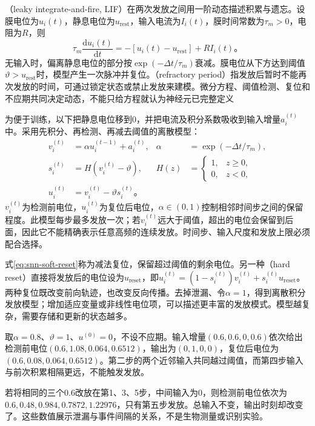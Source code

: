 （leaky integrate-and-fire, LIF）在两次发放之间用一阶动态描述积累与遗忘。设膜电位为$u_i(t)$，静息电位为$u_{\mathrm{rest}}$，输入电流为$I_i(t)$，膜时间常数为$\tau_m>0$，电阻为$R$，则
\begin{equation}
  \tau_m\frac{\mathrm d u_i(t)}{\mathrm d t}
  =-[u_i(t)-u_{\mathrm{rest}}]+RI_i(t)\text{。}
  \label{eq:snn-continuous-lif}
\end{equation}
无输入时，偏离静息电位的部分按$\exp(-\Delta t/\tau_m)$衰减。膜电位从下方达到阈值$\vartheta>u_{\mathrm{rest}}$时，模型产生一次脉冲并复位。（refractory period）指发放后暂时不能再次发放的时间，可通过锁定状态或禁止发放来建模。微分方程、阈值检测、复位和不应期共同决定动态，不能只给方程就认为神经元已完整定义

为便于训练，以下把静息电位移到0，并把电流及积分系数吸收到输入增量$a_i^{(t)}$中。采用先积分、再检测、再减去阈值的离散模型：
\begin{align}
  v_i^{(t)}&=\alpha u_i^{(t-1)}+a_i^{(t)},
  &\alpha&=\exp(-\Delta t/\tau_m),\label{eq:snn-discrete-integrate}\\
  s_i^{(t)}&=H(v_i^{(t)}-\vartheta),
  &H(z)&=\begin{cases}1,&z\geq0,\\0,&z<0,\end{cases}
  \label{eq:snn-discrete-fire}\\
  u_i^{(t)}&=v_i^{(t)}-\vartheta s_i^{(t)}\text{。}
  \label{eq:snn-soft-reset}
\end{align}
$v_i^{(t)}$为检测前电位，$u_i^{(t)}$为复位后电位，$\alpha\in(0,1)$控制相邻时间步之间的保留程度。此模型每步最多发放一次；若$v_i^{(t)}$远大于阈值，超出的电位会保留到后面，因此它不能精确表示任意高频的连续发放。时间步、输入尺度和发放上限必须配合选择。

式\eqref{eq:snn-soft-reset}称为减法复位，保留超过阈值的剩余电位。另一种（hard reset）直接将发放后的电位设为$u_{\mathrm{reset}}$，即$u_i^{(t)}=(1-s_i^{(t)})v_i^{(t)}+s_i^{(t)}u_{\mathrm{reset}}$。两种复位既改变前向轨迹，也改变反向传播。去掉泄漏、令$\alpha=1$，得到离散积分发放模型；增加适应变量或非线性电位项，可以描述更丰富的发放模式。模型越复杂，需要存储和更新的状态越多。

\begin{example}[相同输入在不同间隔下的结果]
  \label{ex:snn-integration}
  取$\alpha=0.8$、$\vartheta=1$、$u^{(0)}=0$，不设不应期。输入增量$(0.6,0.6,0,0.6)$依次给出检测前电位$(0.6,1.08,0.064,0.6512)$，输出为$(0,1,0,0)$，复位后电位为$(0.6,0.08,0.064,0.6512)$。第二步的两个近邻输入共同越过阈值，而第四步输入与前次积累相隔更远，不能触发发放。

  若将相同的三个$0.6$改放在第1、3、5步，中间输入为0，则检测前电位依次为$0.6,0.48,0.984,0.7872,1.22976$，只有第五步发放。总输入不变，输出时刻却改变了。这些数值展示泄漏与事件间隔的关系，不是生物测量或识别实验。
\end{example}

